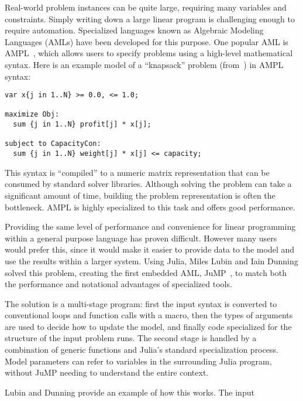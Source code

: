 Real-world problem instances can be quite large, requiring many variables
and constraints.
Simply writing down a large linear program is challenging enough to
require automation.
Specialized languages known as Algebraic Modeling Languages (AMLs)
have been developed for this purpose.
One popular AML is AMPL~\cite{fourer1993ampl}, which allows users to
specify problems using a high-level mathematical syntax.
Here is an example model of a ``knapsack'' problem (from~\cite{LubinDunningIJOC})
in AMPL syntax:

\vspace{-3ex}
\begin{singlespace}
\begin{verbatim}
var x{j in 1..N} >= 0.0, <= 1.0;

maximize Obj:
  sum {j in 1..N} profit[j] * x[j];

subject to CapacityCon:
  sum {j in 1..N} weight[j] * x[j] <= capacity;
\end{verbatim}
\end{singlespace}

\noindent
This syntax is ``compiled'' to a numeric matrix representation that can
be consumed by standard solver libraries.
Although solving the problem can take a significant amount of time,
building the problem representation is often the bottleneck.
AMPL is highly specialized to this task and offers good performance.

Providing the same level of performance and convenience for linear programming
within a general purpose language has proven difficult.
However many users would prefer this, since it would make it easier to
provide data to the model and use the results within a larger system.
Using Julia, Miles Lubin and Iain Dunning solved this problem, creating the
first embedded AML, JuMP~\cite{LubinDunningIJOC}, to match both the performance
and notational advantages of specialized tools.

The solution is a multi-stage program: first the input syntax is converted to
conventional loops and function calls with a macro, then the types of
arguments are used to decide how to update the model, and finally code
specialized for the structure of the input problem runs.
The second stage is handled by a combination of generic functions and
Julia's standard specialization process.
Model parameters can refer to variables in the surrounding Julia program,
without JuMP needing to understand the entire context.

Lubin and Dunning provide an example of how this works.
The input

